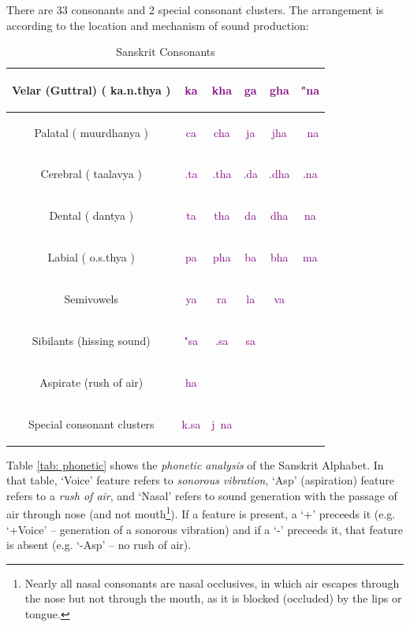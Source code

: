 \documentclass[a4paper, 12pt]{article}
\newcommand \sansletter[1]{
    \fontsize{2cm}{2.4cm}\selectfont
    \sans{#1}
}
\newcommand \sans[1]{
    \textsanskrit{#1}
}
\newcommand \sansconsonant[1]{
    \textcolor{purple} {
    \fontsize{1cm}{1.2cm}\selectfont
    \sans{#1}
    }
}
\begin{document}
There are 33 consonants and 2 special consonant clusters. The arrangement is according to the location and mechanism of sound production:

\begin{table}[hbp]
\begin{center}
    \caption{Sanskrit Consonants}
    \label{tab: consonants}
\begin{tabular}{|c|c|c|c|c|c|}
\hline
    Velar (Guttral) (\sans{ka.n.thya}) &
    \sansconsonant{ka} &
    \sansconsonant{kha} &
    \sansconsonant{ga} &
    \sansconsonant{gha} &
    \sansconsonant{"na} \\
    \hline
    Palatal (\sans{muurdhanya}) &
    \sansconsonant{ca} &
    \sansconsonant{cha} &
    \sansconsonant{ja} &
    \sansconsonant{jha} &
    \sansconsonant{~na} \\
    \hline
    Cerebral (\sans{taalavya}) &
    \sansconsonant{.ta} &
    \sansconsonant{.tha} &
    \sansconsonant{.da} &
    \sansconsonant{.dha} &
    \sansconsonant{.na} \\
    \hline
    Dental (\sans{dantya}) &
    \sansconsonant{ta} &
    \sansconsonant{tha} &
    \sansconsonant{da} &
    \sansconsonant{dha} &
    \sansconsonant{na} \\
    \hline
    Labial (\sans{o.s.thya}) &
    \sansconsonant{pa} &
    \sansconsonant{pha} &
    \sansconsonant{ba} &
    \sansconsonant{bha} &
    \sansconsonant{ma} \\
    \hline
    Semivowels &
    \sansconsonant{ya} &
    \sansconsonant{ra} &
    \sansconsonant{la} &
    \sansconsonant{va} \\
    \hline
    Sibilants (hissing sound) &
    \sansconsonant{"sa} &
    \sansconsonant{.sa} &
    \sansconsonant{sa} \\
    \hline
    Aspirate (rush of air) &
    \sansconsonant{ha} \\
    \hline
    Special consonant clusters &
    \sansconsonant{k.sa} &
    \sansconsonant{j~na}  \\
    \hline
\hline
\end{tabular}
\end{center}
\end{table}

Table \ref{tab: phonetic} shows the \emph{phonetic analysis} of the Sanskrit Alphabet. In that table, `Voice' feature refers to \emph{sonorous vibration}, `Asp' (aspiration) feature refers to a \emph{rush of air}, and `Nasal' refers to sound generation with the passage of air through nose (and not mouth\footnote{Nearly all nasal consonants are nasal occlusives, in which air escapes through the nose but not through the mouth, as it is blocked (occluded) by the lips or tongue.}). If a feature is present, a `+' preceeds it (e.g. `+Voice' -- generation of a sonorous vibration) and if a `-' preceeds it, that feature is absent (e.g. `-Asp' -- no rush of air).
\end{document}
